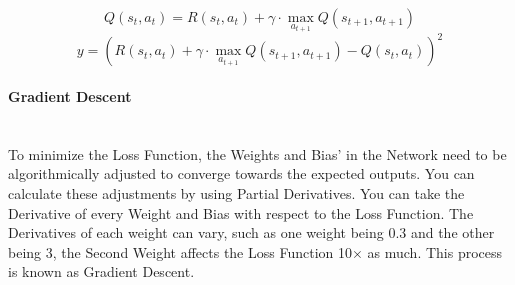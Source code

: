 \begin{flushleft}
                    \[Q(s_t, a_t) = R(s_t, a_t) + \gamma \cdot \max_{a_{t+1}} Q(s_{t+1}, a_{t+1})\]
                    \[y = \left( R(s_t, a_t) + \gamma \cdot \max_{a_{t+1}} Q(s_{t+1}, a_{t+1}) - Q(s_t, a_t) \right)^2\]

                \paragraph{Gradient Descent} \mbox{} \\ 
                    To minimize the Loss Function, the Weights and Bias' in the Network need to be algorithmically adjusted to converge towards the expected outputs. You can
                    calculate these adjustments by using Partial Derivatives. You can take the Derivative of every Weight and Bias with respect to the Loss Function. The Derivatives
                    of each weight can vary, such as one weight being 0.3 and the other being 3, the Second Weight affects the Loss Function 10$\times$ as much. This process is
                    known as Gradient Descent. \\


\end{flushleft}
